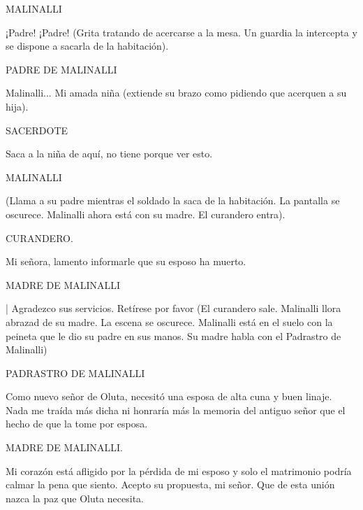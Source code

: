 \documentclass[11pt,letterpaper]{article}
\begin{document}
\begin{center}
MALINALLI
\\
\par
¡Padre! ¡Padre! (Grita tratando de acercarse a la mesa. Un guardia la intercepta y se dispone a sacarla de la habitación). 
\\
\par
PADRE DE MALINALLI
\\
\par
Malinalli... Mi amada niña (extiende su brazo como pidiendo que acerquen a su hija).
\\
\par
SACERDOTE
\\
\par
Saca a la niña de aquí, no tiene porque ver esto.
\\
\par
MALINALLI
\\
\par
(Llama a su padre mientras el soldado la saca de la habitación. La pantalla se oscurece. Malinalli ahora está con su madre. El curandero entra).
\\
\par
CURANDERO.
\\
\par
Mi señora, lamento informarle que su esposo ha muerto.
\\
\par
MADRE DE MALINALLI
\\
\par|
Agradezco sus servicios. Retírese por favor (El curandero sale. Malinalli llora abrazad de su madre. La escena se oscurece. Malinalli está en el suelo con la peineta que le dio su padre en sus manos. Su madre habla con el Padrastro de Malinalli)
\\
\par
PADRASTRO DE MALINALLI
\\
\par
Como nuevo señor de Oluta, necesitó una esposa de alta cuna y buen linaje. Nada me traída más dicha ni honraría más la memoria del antiguo señor que el hecho de que la tome por esposa.
\\
\par
MADRE DE MALINALLI.
\\
\par
Mi corazón está afligido por la pérdida de mi esposo y solo el matrimonio podría calmar la pena que siento. Acepto su propuesta, mi señor. Que de esta unión nazca la paz que Oluta necesita.
\end{center}
\end{document}
